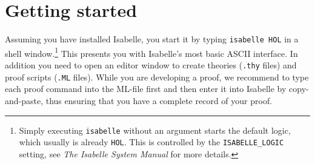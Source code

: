 \section{Getting started}

Assuming you have installed Isabelle, you start it by typing \texttt{isabelle
  HOL} in a shell window.\footnote{Simply executing \texttt{isabelle} without
  an argument starts the default logic, which usually is already \texttt{HOL}.
  This is controlled by the \texttt{ISABELLE_LOGIC} setting, see \emph{The
    Isabelle System Manual} for more details.} This presents you with
Isabelle's most basic ASCII interface.  In addition you need to open an editor
window to create theories (\texttt{.thy} files) and proof scripts
(\texttt{.ML} files). While you are developing a proof, we recommend to type
each proof command into the ML-file first and then enter it into Isabelle by
copy-and-paste, thus ensuring that you have a complete record of your proof.

